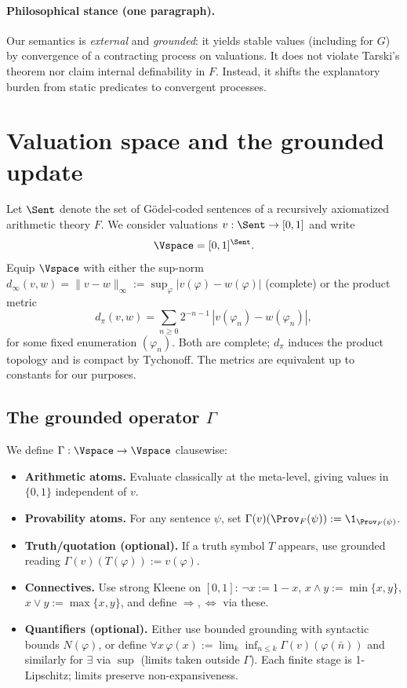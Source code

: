 \documentclass[12]{amsart}
\theoremstyle{plain}
\begin{document}
\paragraph{Philosophical stance (one paragraph).}
Our semantics is \emph{external} and \emph{grounded}: it yields stable values (including for $G$) by convergence of a contracting process on valuations. It does not violate Tarski's theorem nor claim internal definability in $F$. Instead, it shifts the explanatory burden from static predicates to convergent processes.

\section{Valuation space and the grounded update}\label{sec:Gamma}

Let $\Sent$ denote the set of G\"odel-coded sentences of a recursively axiomatized arithmetic theory $F$.
We consider valuations $v:\Sent\to[0,1]$ and write
\[
\Vspace=[0,1]^{\Sent}.
\]
Equip $\Vspace$ with either the sup-norm $d_\infty(v,w)=\|v-w\|_\infty:=\sup_{\varphi}|v(\varphi)-w(\varphi)|$ (complete) or the product metric
\[
d_\pi(v,w)=\sum_{n\ge 0}2^{-n-1}\,|v(\varphi_n)-w(\varphi_n)|,
\]
for some fixed enumeration $(\varphi_n)$. Both are complete; $d_\pi$ induces the product topology and is compact by Tychonoff. The metrics are equivalent up to constants for our purposes.

\subsection{The grounded operator $\Gamma$}\label{subsec:GammaDef}
We define $\Gamma:\Vspace\to\Vspace$ clausewise:
\begin{itemize}[leftmargin=2em]
\item \textbf{Arithmetic atoms.} Evaluate classically at the meta-level, giving values in $\{0,1\}$ independent of $v$.
\item \textbf{Provability atoms.} For any sentence $\psi$, set $\Gamma(v)(\Prov_F(\psi)):=\1_{\Prov_F(\psi)}$.
\item \textbf{Truth/quotation (optional).} If a truth symbol $T$ appears, use grounded reading $\Gamma(v)(T(\varphi)):=v(\varphi)$.
\item \textbf{Connectives.} Use strong Kleene on $[0,1]$: $\neg x:=1-x$, $x\wedge y:=\min\{x,y\}$, $x\vee y:=\max\{x,y\}$, and define $\Rightarrow,\Leftrightarrow$ via these.
\item \textbf{Quantifiers (optional).} Either use bounded grounding with syntactic bounds $N(\varphi)$, or define $\forall x\,\varphi(x):=\lim_{k}\inf_{n\le k}\Gamma(v)(\varphi(\bar n))$ and similarly for $\exists$ via $\sup$ (limits taken outside $\Gamma$). Each finite stage is 1-Lipschitz; limits preserve non-expansiveness.
\end{itemize}
\end{document}
